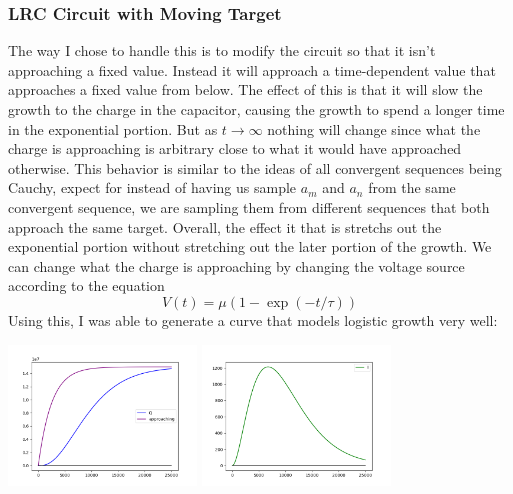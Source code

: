 \documentclass{report}
\begin{document}
            \subsubsection{LRC Circuit with Moving Target}
                The way I chose to handle this is to modify the circuit so that it isn't approaching a fixed value. Instead it will approach a time-dependent value that approaches a fixed value from below. The effect of this is that it will slow the growth to the charge in the capacitor, causing the growth to spend a longer time in the exponential portion. But as $t \rightarrow \infty$ nothing will change since what the charge is approaching is arbitrary close to what it would have approached otherwise.
                \newline\indent
                This behavior is similar to the ideas of all convergent sequences being Cauchy, expect for instead of having us sample $a_m$ and $a_n$ from the same convergent sequence, we are sampling them from different sequences that both approach the same target.
                \newline\indent
                Overall, the effect it that is stretchs out the exponential portion without stretching out the later portion of the growth. We can change what the charge is approaching by changing the voltage source according to the equation
                \begin{equation}
                    V(t) =  \mu (1 - \exp(-t/\tau))
                \end{equation}
                Using this, I was able to generate a curve that models logistic growth very well:
                \begin{center}
                    \includegraphics[width=5cm]{plots/lrc/Charge.png}
                    \includegraphics[width=5cm]{plots/lrc/Current.png}
                \end{center}
\end{document}

